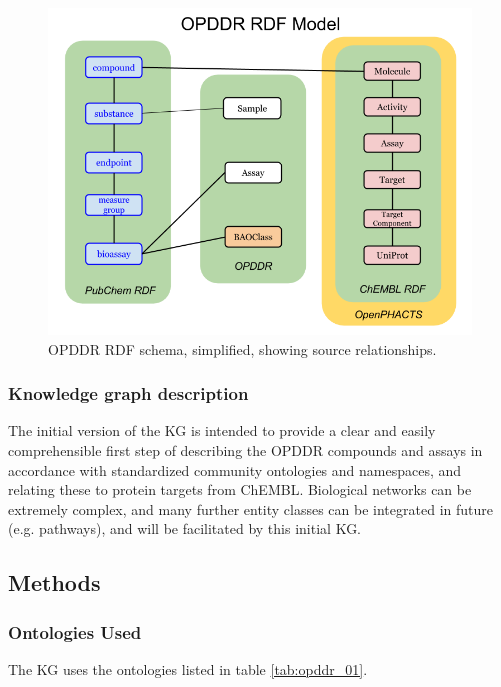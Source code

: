 \begin{figure}
    \centering
    \includegraphics[width=\linewidth]{figures/opddr/OPDDR_schema.png}
    \caption{OPDDR RDF schema, simplified, showing source relationships.}
    \label{fig:opddr_01}
\end{figure}

\subsubsection{Knowledge graph description}

The initial version of the KG is intended to provide a clear and easily comprehensible first step of describing the OPDDR compounds and assays in accordance with standardized community ontologies and namespaces, and relating these to protein targets from ChEMBL.  Biological networks can be extremely complex, and many further entity classes can be integrated in future (e.g. pathways), and will be facilitated by this initial KG.

\subsection{Methods}

\subsubsection{Ontologies Used}

The KG uses the ontologies listed in table \ref{tab:opddr_01}.

